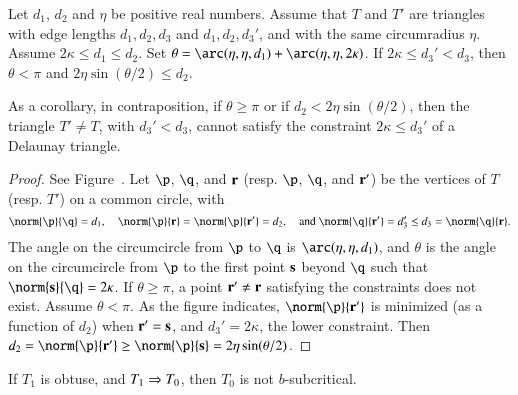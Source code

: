 \begin{lemma}  
  Let $d_1$, $d_2$ and $\eta$ be positive real numbers.  Assume that
  $T$ and $T'$ are triangles with edge lengths $d_1,d_2,d_3$ and
  $d_1,d_2,d_3'$, and with the same circumradius $\eta$. Assume
  $2\kappa\le d_1\le d_2$.  Set $\theta =
  \arc(\eta,\eta,d_1)+\arc(\eta,\eta,2\kappa)$.  If $2\kappa \le d_3'
  < d_3$, then $\theta < \pi$ and $2\eta\sin(\theta/2) \le d_2$.
\end{lemma}

As a corollary, 
in contraposition, if $\theta\ge\pi$ or if $d_2 < 2\eta\sin(\theta/2)$,
then the triangle $T'\ne T$, with $d_3' < d_3$,
cannot satisfy the constraint $2\kappa\le d_3'$ of a  Delaunay triangle.


\begin{proof} 
  See Figure~.  Let $\p$, $\q$, and ${\mathbf r}$ (resp. $\p$,
  $\q$, and ${\mathbf r}'$) be the vertices of $T$ (resp. $T'$) on a common
  circle, with
\[
\norm{\p}{\q} =d_1, 
\quad\norm{\p}{\r}=\norm{\p}{\r'}=d_2, \quad\text{and } 
\norm{\q}{\r'} = d_3' \le d_3=\norm{\q}{\r}.
\]
The angle on the circumcircle from $\p$ to $\q$ is
$\arc(\eta,\eta,d_1)$, and $\theta$ is the angle on the circumcircle
from $\p$ to the first point ${\mathbf s}$ beyond $\q$ such that
$\norm{\s}{\q}=2\kappa$.  If $\theta\ge\pi$, a point ${\mathbf r}'\ne {\mathbf r}$
satisfying the constraints does not exist.  Assume $\theta < \pi$.  As
the figure indicates, $\norm{\p}{\r'}$ is minimized (as a function of
$d_2$) when ${\mathbf r}'={\mathbf s}$, and $d_3' = 2\kappa$, the lower constraint.
Then $d_2 = \norm{\p}{\r'}\ge \norm{\p}{\s}= 2\eta\sin(\theta/2)$.
\end{proof}



\begin{lemma}
  If $T_1$ is obtuse, and $T_1 \Rightarrow T_0$, then $T_0$ is not
  $b$-subcritical.
\end{lemma}


